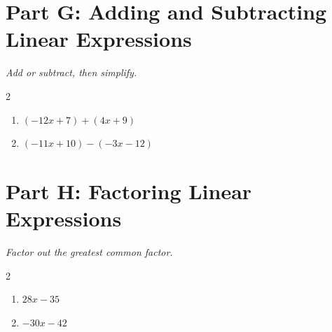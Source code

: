 \documentclass[11pt]{article}
\begin{document}
\section*{Part G: Adding and Subtracting Linear Expressions}
\noindent\textit{Add or subtract, then simplify.}
\begin{multicols}{2}
\begin{enumerate}
  \item $(-12x + 7) + (4x + 9)$
  \vspace{1.4cm}
  \item $(-11x + 10) - (-3x - 12)$
  \vspace{1.4cm}
\end{enumerate}
\end{multicols}

\section*{Part H: Factoring Linear Expressions}
\noindent\textit{Factor out the greatest common factor.}
\begin{multicols}{2}
\begin{enumerate}
  \item $28x - 35$
  \vspace{1.3cm}
  \item $-30x - 42$
  \vspace{1.3cm}
\end{enumerate}
\end{multicols}
\end{document}
